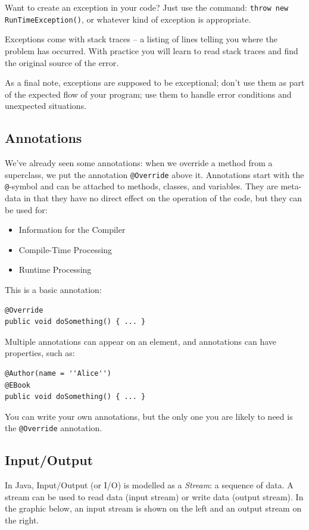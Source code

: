 Want to create an exception in your code? Just use the command: \texttt{throw new RunTimeException()}, or whatever kind of exception is appropriate.

Exceptions come with stack traces -- a listing of lines telling you where the problem has occurred. With practice you will learn to read stack traces and find the original source of the error.

As a final note, exceptions are supposed to be exceptional; don't use them as part of the expected flow of your program; use them to handle error conditions and unexpected situations.


\subsection*{Annotations}
We've already seen some annotations: when we override a method from a superclass, we put the annotation \texttt{@Override} above it. Annotations start with the \texttt{@}-symbol and can be attached to methods, classes, and variables. They are meta-data in that they have no direct effect on the operation of the code, but they can be used for:

\begin{itemize}
	\item Information for the Compiler
	\item Compile-Time Processing
	\item Runtime Processing
\end{itemize}

This is a basic annotation:
\vspace{-1em}
\begin{verbatim}
@Override
public void doSomething() { ... }
\end{verbatim}
\vspace{-1em}
Multiple annotations can appear on an element, and annotations can have properties, such as:

\begin{verbatim}
@Author(name = ''Alice'')
@EBook
public void doSomething() { ... }
\end{verbatim}

You can write your own annotations, but the only one you are likely to need is the \texttt{@Override} annotation. 


\subsection*{Input/Output}
In Java, Input/Output (or I/O) is modelled as a \textit{Stream}: a sequence of data. A stream can be used to read data (input stream) or write data (output stream). In the graphic below, an input stream is shown on the left and an output stream on the right.

